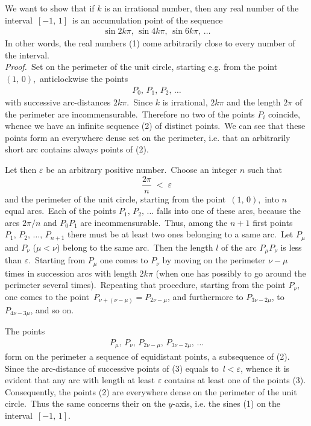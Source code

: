 \documentclass[12pt]{article}
\theoremstyle{definition}
\begin{document}
We want to show that if $k$ is an irrational number, then any real number of the interval \,$[-1,\,1]$\, is an accumulation point of the sequence
\begin{align}
\sin2k\pi,\,\sin4k\pi,\,\sin6k\pi,\,\ldots
\end{align}
In other words, the real numbers (1) come arbitrarily close to every number of the interval.\\


\emph{Proof.}\, Set on the perimeter of the unit circle, starting e.g. from the point \,$(1,\,0)$,\, anticlockwise the points 
\begin{align}
P_0,\,P_1,\,P_2,\,\ldots
\end{align}
with successive arc-distances $2k\pi$.\, Since $k$ is irrational, $2k\pi$ and the length $2\pi$ of the perimeter are incommensurable.\, Therefore no two of the points $P_i$ coincide, whence we have an infinite sequence (2) of distinct points.\, We can see that these points form an everywhere dense set on the perimeter, i.e. that an arbitrarily short arc contains always points of (2).

Let then $\varepsilon$ be an arbitrary positive number.\, Choose an integer $n$ such that 
$$\frac{2\pi}{n} \;<\; \varepsilon$$
and  the perimeter of the unit circle, starting from the point \,$(1,\,0)$,\, into $n$ equal arcs.\, Each of the points $P_1,\,P_2,\,\ldots$ falls into one of these arcs, because the arcs $2\pi/n$ and $P_0P_1$ are incommensurable.\, Thus, among the $n\!+\!1$ first points $P_1,\,P_2,\,\ldots,\,P_{n+1}$ there must be at least two ones belonging to a same arc.\, Let $P_\mu$ and $P_\nu$ ($\mu < \nu$) belong to the same arc.\, Then the length $l$ of the arc $P_\mu P_\nu$ is less than $\varepsilon$.\, Starting from $P_\mu$ one comes to $P_\nu$ by moving on the perimeter $\nu\!-\!\mu$ times in succession arcs with length $2k\pi$ (when one has possibly to go around the perimeter several times).\, Repeating that procedure, starting from the point $P_\nu$, one comes to the point\, 
$P_{\nu+(\nu-\mu)} = P_{2\nu-\mu}$, and furthermore to $P_{3\nu-2\mu}$, to $P_{4\nu-3\mu}$, and so on.\, 

The points
\begin{align}
P_\mu,\, P_\nu,\, P_{2\nu-\mu},\, P_{3\nu-2\mu},\,\ldots
\end{align}
form on the perimeter a sequence of equidistant points, a subsequence of (2).\, Since the arc-distance of successive points of (3) equals to\, $l < \varepsilon$, whence it is evident that any arc with length at least $\varepsilon$ contains at least one of the points (3).\, Consequently, the points (2) are everywhere dense on the perimeter of the unit circle.\, Thus the same concerns their  on the $y$-axis, i.e. the sines (1) on the interval 
\,$[-1,\,1]$.



\end{document}
